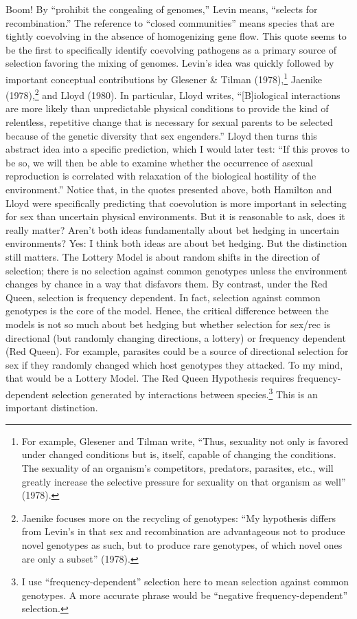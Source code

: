 \documentclass[
  letterpaper,
]{book}
\begin{document}
Boom! By ``prohibit the congealing of genomes,'' Levin means, ``selects
for recombination.'' The reference to ``closed communities'' means
species that are tightly coevolving in the absence of homogenizing gene
flow. This quote seems to be the first to specifically identify
coevolving pathogens as a primary source of selection favoring the
mixing of genomes. Levin's idea was quickly followed by important
conceptual contributions by Glesener \& Tilman (1978),\footnote{For
  example, Glesener and Tilman write, ``Thus, sexuality not only is
  favored under changed conditions but is, itself, capable of changing
  the conditions. The sexuality of an organism's competitors, predators,
  parasites, etc., will greatly increase the selective pressure for
  sexuality on that organism as well'' (1978).} Jaenike
(1978),\footnote{Jaenike focuses more on the recycling of genotypes:
  ``My hypothesis differs from Levin's in that sex and recombination are
  advantageous not to produce novel genotypes as such, but to produce
  rare genotypes, of which novel ones are only a subset'' (1978).} and
Lloyd (1980). In particular, Lloyd writes, ``{[}B{]}iological
interactions are more likely than unpredictable physical conditions to
provide the kind of relentless, repetitive change that is necessary for
sexual parents to be selected because of the genetic diversity that sex
engenders.'' Lloyd then turns this abstract idea into a specific
prediction, which I would later test: ``If this proves to be so, we will
then be able to examine whether the occurrence of asexual reproduction
is correlated with relaxation of the biological hostility of the
environment.'' Notice that, in the quotes presented above, both Hamilton
and Lloyd were specifically predicting that coevolution is more
important in selecting for sex than uncertain physical environments. But
it is reasonable to ask, does it really matter? Aren't both ideas
fundamentally about bet hedging in uncertain environments? Yes: I think
both ideas are about bet hedging. But the distinction still matters. The
Lottery Model is about random shifts in the direction of selection;
there is no selection against common genotypes unless the environment
changes by chance in a way that disfavors them. By contrast, under the
Red Queen, selection is frequency dependent. In fact, selection against
common genotypes is the core of the model. Hence, the critical
difference between the models is not so much about bet hedging but
whether selection for sex/rec is directional (but randomly changing
directions, a lottery) or frequency dependent (Red Queen). For example,
parasites could be a source of directional selection for sex if they
randomly changed which host genotypes they attacked. To my mind, that
would be a Lottery Model. The Red Queen Hypothesis requires
frequency-dependent selection generated by interactions between
species.\footnote{I use ``frequency-dependent'' selection here to mean
  selection against common genotypes. A more accurate phrase would be
  ``negative frequency-dependent'' selection.} This is an important
distinction.
\end{document}

